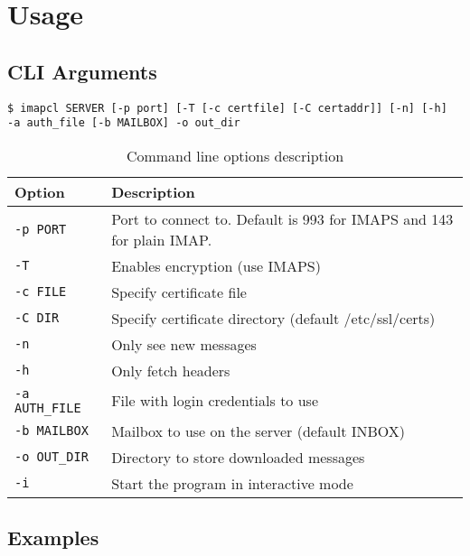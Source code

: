 \documentclass[a4]{report}
\begin{document}
\chapter{Usage}

\section{CLI Arguments}

\begin{mdframed}
\begin{verbatim}
$ imapcl SERVER [-p port] [-T [-c certfile] [-C certaddr]] [-n] [-h]
-a auth_file [-b MAILBOX] -o out_dir
\end{verbatim}
\end{mdframed}

\begin{table}[h]
  \renewcommand*{\arraystretch}{1.0}
  \centering
  \begin{tabular}{|l|l|}
    \hline
    \rowcolor{lightgray}
    Option & Description\\
    \hline
    \texttt{-p PORT}      & Port to connect to. Default is 993 for IMAPS and 143 for plain IMAP.\\
    \texttt{-T}          & Enables encryption (use IMAPS)\\
    \texttt{-c FILE}     & Specify certificate file\\
    \texttt{-C DIR}      & Specify certificate directory (default /etc/ssl/certs)\\
    \texttt{-n}          & Only see new messages\\
    \texttt{-h}          & Only fetch headers\\
    \texttt{-a AUTH\_FILE}& File with login credentials to use\\
    \texttt{-b MAILBOX}  & Mailbox to use on the server (default INBOX)\\
    \texttt{-o OUT\_DIR}  & Directory to store downloaded messages\\
    \texttt{-i}          & Start the program in interactive mode\\
    \hline
  \end{tabular}
  \caption{Command line options description}
\end{table}

\section{Examples}
\end{document}
